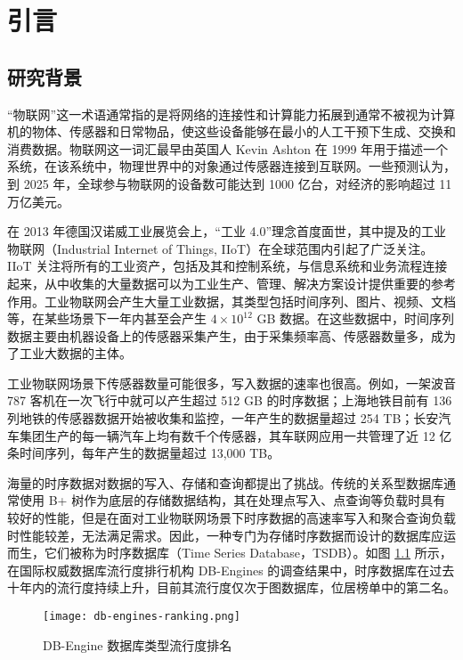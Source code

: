 
\chapter{引言}
\section{研究背景\label{sec:chap1-sec1}}
“物联网”这一术语通常指的是将网络的连接性和计算能力拓展到通常不被视为计算机的物体、传感器和日常物品，使这些设备能够在最小的人工干预下生成、交换和消费数据。物联网这一词汇最早由英国人 Kevin Ashton 在 1999 年用于描述一个系统，在该系统中，物理世界中的对象通过传感器连接到互联网\cite{li2015internet}。一些预测认为，到 2025 年，全球参与物联网的设备数可能达到 1000 亿台，对经济的影响超过 11 万亿美元\cite{rose2015internet}。

在 2013 年德国汉诺威工业展览会上，“工业 4.0”理念首度面世\cite{ghobakhloo2020industry}，其中提及的工业物联网（Industrial Internet of Things, IIoT）在全球范围内引起了广泛关注。IIoT 关注将所有的工业资产，包括及其和控制系统，与信息系统和业务流程连接起来，从中收集的大量数据可以为工业生产、管理、解决方案设计提供重要的参考作用\cite{sisinni2018industrial}。工业物联网会产生大量工业数据，其类型包括时间序列、图片、视频、文档等，在某些场景下一年内甚至会产生 $4\times 10^{12}$ GB 数据\cite{ge2012riseofindustrial}。在这些数据中，时间序列数据主要由机器设备上的传感器采集产生，由于采集频率高、传感器数量多，成为了工业大数据的主体\cite{di2019industrial}。

工业物联网场景下传感器数量可能很多，写入数据的速率也很高。例如，一架波音 787 客机在一次飞行中就可以产生超过 512 GB 的时序数据\cite{ronkainen2015designing}；上海地铁目前有 136 列地铁的传感器数据开始被收集和监控，一年产生的数据量超过 254 TB；长安汽车集团生产的每一辆汽车上均有数千个传感器，其车联网应用一共管理了近 12 亿条时间序列，每年产生的数据量超过 13,000 TB。

海量的时序数据对数据的写入、存储和查询都提出了挑战。传统的关系型数据库通常使用 B+ 树作为底层的存储数据结构，其在处理点写入、点查询等负载时具有较好的性能，但是在面对工业物联网场景下时序数据的高速率写入和聚合查询负载时性能较差，无法满足需求\cite{jensen2017time}。因此，一种专门为存储时序数据而设计的数据库应运而生，它们被称为时序数据库（Time Series Database，TSDB）。如图 \ref{fig:db-engine} 所示，在国际权威数据库流行度排行机构 DB-Engines 的调查结果中，时序数据库在过去十年内的流行度持续上升，目前其流行度仅次于图数据库，位居榜单中的第二名。

\begin{figure}
  \centering
  \texttt{[image: db-engines-ranking.png]}
  \caption{DB-Engine 数据库类型流行度排名}
  \label{fig:db-engine}
\end{figure}


